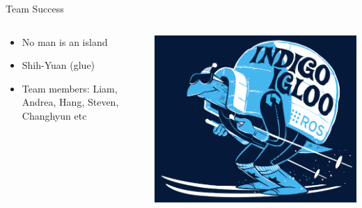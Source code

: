 \documentclass[aspectratio=43]{beamer}
\begin{document}

\begin{frame}{Team Success}
\begin{columns}
	\begin{column}{0.55\textwidth}
		\begin{itemize}
			\item No man is an island
			\item \alert{Shih-Yuan} (glue)
\item Team members: Liam, Andrea, Hang, Steven, Changhyun etc
		\end{itemize}
	\end{column}
	\begin{column}{0.45\textwidth}
		\centering
		\includegraphics[width=\textwidth]{fig/indigoigloo_600.png}
	\end{column}
\end{columns}

\end{frame}
\end{document}
